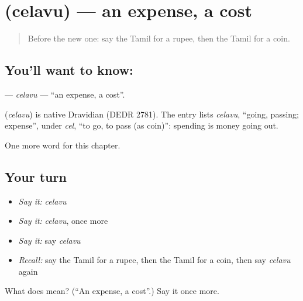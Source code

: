 \section[\texorpdfstring{\ta{செலவு} (celavu)}{செலவு (celavu)}]{ (celavu) — an expense, a cost}

\label{lesson:TA-C222-celavu}



\begin{quote}
Before the new one: say the Tamil for a rupee, then the Tamil for a coin.
\end{quote}

\subsection*{You'll want to know: }
\textbf{} — \emph{celavu} — \textquotedblleft{}an expense, a cost\textquotedblright{}.

\begin{cousinweb}
\textbf{} (\emph{celavu}) is native Dravidian (DEDR 2781). The entry lists \emph{celavu}, \textquotedblleft{}going, passing; expense\textquotedblright{}, under \emph{cel}, \textquotedblleft{}to go, to pass (as coin)\textquotedblright{}: spending is money going out.
\end{cousinweb}

\begin{grammarlens}[title={What you've built}]
One more word for this chapter.
\end{grammarlens}

\subsection*{Your turn}
\begin{itemize}
\raggedright
  \item \emph{Say it:} \emph{celavu}
  \item \emph{Say it:} \emph{celavu}, once more
  \item \emph{Say it:} say \emph{celavu}
  \item \emph{Recall:} say the Tamil for a rupee, then the Tamil for a coin, then say \emph{celavu} again
\end{itemize}

\begin{tcolorbox}[breakable,colback=teal!4,colframe=teal!35!black,title={Before you move on}]
What does  mean? (\textquotedblleft{}An expense, a cost\textquotedblright{}.) Say it once more.
\end{tcolorbox}

